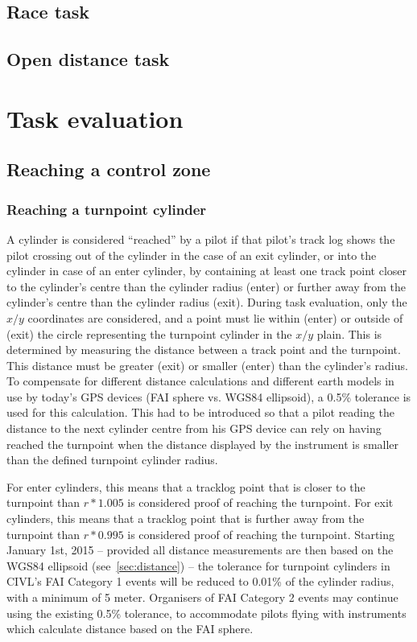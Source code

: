 \documentclass{article}
\begin{document}
\subsection{Race task}
\subsection{Open distance task}

\newpage
\section{Task evaluation}
\subsection{Reaching a control zone}
\subsubsection{Reaching a turnpoint cylinder}
A cylinder is considered “reached” by a pilot if that pilot’s track log shows
the pilot crossing out of the cylinder in the case of an exit cylinder, or into
the cylinder in case of an enter cylinder, by containing at least one track
point closer to the cylinder’s centre than the cylinder radius (enter) or
further away from the cylinder’s centre than the cylinder radius (exit). During
task evaluation, only the \(x/y\) coordinates are considered, and a point must
lie within (enter) or outside of (exit) the circle representing the turnpoint
cylinder in the \(x/y\) plain. This is determined by measuring the distance
between a track point and the turnpoint. This distance must be greater (exit)
or smaller (enter) than the cylinder’s radius.  To compensate for different
distance calculations and different earth models in use by today’s GPS devices
(FAI sphere vs. WGS84 ellipsoid), a 0.5\% tolerance is used for this
calculation. This had to be introduced so that a pilot reading the distance to
the next cylinder centre from his GPS device can rely on having reached the
turnpoint when the distance displayed by the instrument is smaller than the
defined turnpoint cylinder radius.

For enter cylinders, this means that a tracklog point that is closer to the
turnpoint than \(r*1.005\) is considered proof of reaching the turnpoint. For
exit cylinders, this means that a tracklog point that is further away from the
turnpoint than \(r*0.995\) is considered proof of reaching the turnpoint.
Starting January 1st, 2015 – provided all distance measurements are then based
on the WGS84 ellipsoid (see~\ref{sec:distance}) – the tolerance for turnpoint
cylinders in CIVL’s FAI Category 1 events will be reduced to 0.01\% of the
cylinder radius, with a minimum of 5 meter. Organisers of FAI Category 2 events
may continue using the existing 0.5\% tolerance, to accommodate pilots flying
with instruments which calculate distance based on the FAI sphere.
\end{document}
